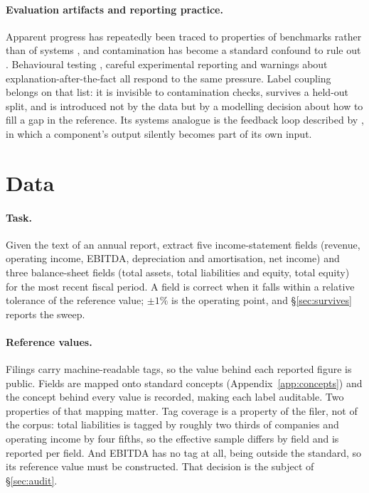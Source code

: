 \documentclass[11pt]{article}
\begin{document}
\paragraph{Evaluation artifacts and reporting practice.}
Apparent progress has repeatedly been traced to properties of benchmarks rather than of
systems \citep{gururangan2018annotation,poliak2018hypothesis,kaushik2018much,
bowman2021will}, and contamination has become a standard confound to rule out
\citep{sainz2023nlp}. Behavioural testing \citep{ribeiro2020beyond}, careful
experimental reporting \citep{dodge2019show} and warnings about
explanation-after-the-fact \citep{lipton2019troubling} all respond to the same
pressure. Label coupling belongs on that list: it is invisible to contamination checks,
survives a held-out split, and is introduced not by the data but by a modelling decision
about how to fill a gap in the reference. Its systems analogue is the feedback loop
described by \citet{sculley2015hidden}, in which a component's output silently becomes
part of its own input.

\section{Data}
\label{sec:protocol}

\paragraph{Task.} Given the text of an annual report, extract five income-statement
fields (revenue, operating income, EBITDA, depreciation and amortisation, net income)
and three balance-sheet fields (total assets, total liabilities and equity, total
equity) for the most recent fiscal period. A field is correct when it falls within a
relative tolerance of the reference value; $\pm1\%$ is the operating point, and
\S\ref{sec:survives} reports the sweep.

\paragraph{Reference values.} Filings carry machine-readable tags, so the value behind
each reported figure is public. Fields are mapped onto standard concepts
(Appendix~\ref{app:concepts}) and the concept behind every value is recorded, making
each label auditable. Two properties of that mapping matter. Tag coverage is a property
of the filer, not of the corpus: total liabilities is tagged by roughly two thirds of
companies and operating income by four fifths, so the effective sample differs by field
and is reported per field. And EBITDA has no tag at all, being outside the
standard, so its reference value must be constructed. That decision is the subject of
\S\ref{sec:audit}.
\end{document}
